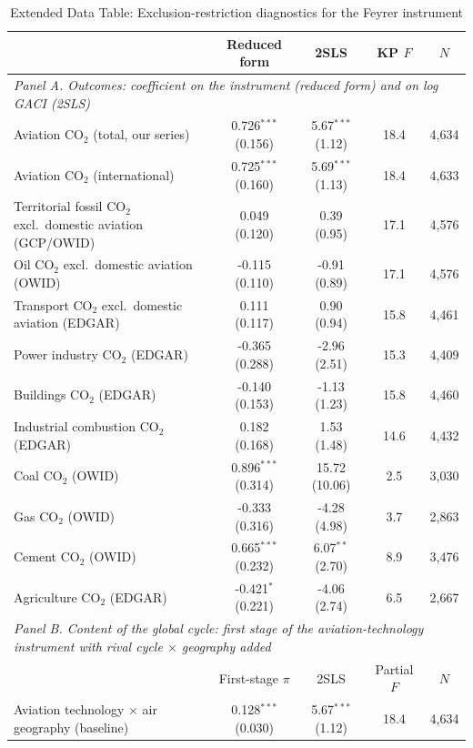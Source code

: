 \begin{table}[htbp]
\centering
\begin{threeparttable}
\caption{Extended Data Table: Exclusion-restriction diagnostics for the Feyrer instrument}
\label{tab:exclusion}
\scriptsize
\begin{tabular}{lcccc}
\toprule
 & Reduced form & 2SLS & KP $F$ & $N$ \\
\midrule
\multicolumn{5}{l}{\textit{Panel A. Outcomes: coefficient on the instrument (reduced form) and on log GACI (2SLS)}} \\
  Aviation CO$_2$ (total, our series) & 0.726$^{***}$ (0.156) & 5.67$^{***}$ (1.12) & 18.4 & 4,634 \\
  Aviation CO$_2$ (international) & 0.725$^{***}$ (0.160) & 5.69$^{***}$ (1.13) & 18.4 & 4,633 \\
  Territorial fossil CO$_2$ excl.\ domestic aviation (GCP/OWID) & 0.049 (0.120) & 0.39 (0.95) & 17.1 & 4,576 \\
  Oil CO$_2$ excl.\ domestic aviation (OWID) & -0.115 (0.110) & -0.91 (0.89) & 17.1 & 4,576 \\
  Transport CO$_2$ excl.\ domestic aviation (EDGAR) & 0.111 (0.117) & 0.90 (0.94) & 15.8 & 4,461 \\
  Power industry CO$_2$ (EDGAR) & -0.365 (0.288) & -2.96 (2.51) & 15.3 & 4,409 \\
  Buildings CO$_2$ (EDGAR) & -0.140 (0.153) & -1.13 (1.23) & 15.8 & 4,460 \\
  Industrial combustion CO$_2$ (EDGAR) & 0.182 (0.168) & 1.53 (1.48) & 14.6 & 4,432 \\
  Coal CO$_2$ (OWID) & 0.896$^{***}$ (0.314) & 15.72 (10.06) & 2.5 & 3,030 \\
  Gas CO$_2$ (OWID) & -0.333 (0.316) & -4.28 (4.98) & 3.7 & 2,863 \\
  Cement CO$_2$ (OWID) & 0.665$^{***}$ (0.232) & 6.07$^{**}$ (2.70) & 8.9 & 3,476 \\
  Agriculture CO$_2$ (EDGAR) & -0.421$^{*}$ (0.221) & -4.06 (2.74) & 6.5 & 2,667 \\
\midrule
\multicolumn{5}{l}{\textit{Panel B. Content of the global cycle: first stage of the aviation-technology instrument with rival cycle $\times$ geography added}} \\
 & First-stage $\pi$ & 2SLS & Partial $F$ & $N$ \\
  Aviation technology $\times$ air geography (baseline) & 0.128$^{***}$ (0.030) & 5.67$^{***}$ (1.12) & 18.4 & 4,634 \\

\end{tabular}
\end{threeparttable}
\end{table}
